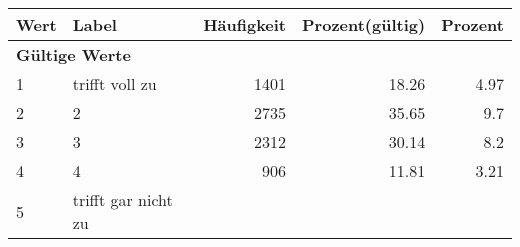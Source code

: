      \begin{longtable}{lXrrr}
     \toprule
     \textbf{Wert} & \textbf{Label} & \textbf{Häufigkeit} & \textbf{Prozent(gültig)} & \textbf{Prozent} \\
     \endhead
     \midrule
     \multicolumn{5}{l}{\textbf{Gültige Werte}}\\

     1 &
     \multicolumn{1}{X}{ trifft voll zu   } &


       \num{1401} &
       \num[round-mode=places,round-precision=2]{18,26} &
         \num[round-mode=places,round-precision=2]{4,97} \\

     2 &
     \multicolumn{1}{X}{ 2   } &


       \num{2735} &
       \num[round-mode=places,round-precision=2]{35,65} &
         \num[round-mode=places,round-precision=2]{9,7} \\

     3 &
     \multicolumn{1}{X}{ 3   } &


       \num{2312} &
       \num[round-mode=places,round-precision=2]{30,14} &
         \num[round-mode=places,round-precision=2]{8,2} \\

     4 &
     \multicolumn{1}{X}{ 4   } &


       \num{906} &
       \num[round-mode=places,round-precision=2]{11,81} &
         \num[round-mode=places,round-precision=2]{3,21} \\

     5 &
     \multicolumn{1}{X}{ trifft gar nicht zu   } &



\end{longtable}
